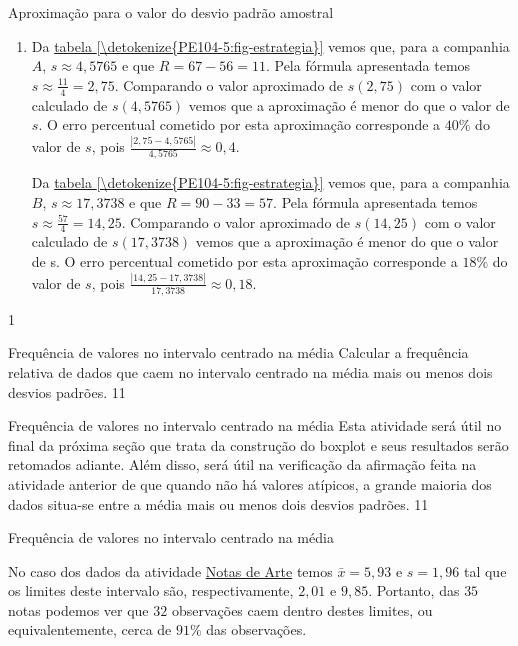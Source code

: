 {{{\begin{answer}{Aproximação para o valor do desvio padrão amostral}
{\begin{enumerate}
\item Da \hyperref[\detokenize{PE104-5:fig-estrategia}]{tabela \ref{\detokenize{PE104-5:fig-estrategia}}} vemos que, para a companhia $A$, $s\approx4{,}5765$ e que $R=67-56=11$. Pela fórmula apresentada temos $s\approx\frac{11}{4}=2{,}75$. Comparando o valor aproximado de $s(2{,}75)$ com o valor calculado de $s(4{,}5765)$ vemos que a aproximação é menor do que o valor de $s$. O erro percentual cometido por esta aproximação corresponde a $40\%$ do valor de $s$, pois $\frac{|2{,}75-4{,}5765|}{4{,}5765}\approx0{,}4$.

Da \hyperref[\detokenize{PE104-5:fig-estrategia}]{tabela \ref{\detokenize{PE104-5:fig-estrategia}}} vemos que, para a companhia $B$, $s\approx17{,}3738$ e que $R=90-33=57$. Pela fórmula apresentada temos $s\approx\frac{57}{4}=14{,}25$. Comparando o valor aproximado de $s(14{,}25)$ com o valor calculado de $s(17{,}3738)$ vemos que a aproximação é menor do que o valor de s. O erro percentual cometido por esta aproximação corresponde a $18\%$ do valor de $s$, pois $\frac{|14{,}25-17{,}3738|}{17{,}3738}\approx0{,}18$.
\end{enumerate}
}{1}
\end{answer}


\begin{objectives}{Frequência de valores no intervalo centrado na média}
{
Calcular a frequência relativa de dados que caem no intervalo centrado na média mais ou menos dois desvios padrões.
}{1}{1}
\end{objectives}

\begin{sugestions}{Frequência de valores no intervalo centrado na média}
{
Esta atividade será útil no final da próxima seção que trata da construção do boxplot e seus resultados serão retomados adiante. Além disso, será útil na verificação da afirmação feita na atividade anterior de que quando não há valores atípicos, a grande maioria dos dados situa-se entre a média mais ou menos dois desvios padrões.
}{1}{1}
\end{sugestions}

\begin{answer}{Frequência de valores no intervalo centrado na média}
{
No caso dos dados da atividade \hyperref[\detokenize{PE104-0:ativ-notas-de-artes}]{Notas de Arte} temos $\bar{x}=5{,}93$ e $s=1{,}96$ tal que os limites deste intervalo são, respectivamente, $2{,}01$ e $9{,}85$. Portanto, das $35$ notas podemos ver que $32$ observações caem dentro destes limites, ou equivalentemente, cerca de $91\%$ das observações.

}
\end{answer}}}}
